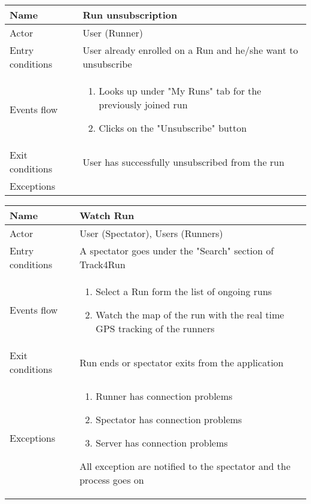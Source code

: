 \begin{table}[h!]
\begin{tabular}{|l|p{12cm}|}
\hline
Name             & Run unsubscription \\ \hline
Actor            & User (Runner) \\ \hline
Entry conditions & User already enrolled on a Run and he/she want to unsubscribe \\ \hline
Events flow      & \begin{enumerate}
\item Looks up under "My Runs" tab for the previously joined run
\item Clicks on the "Unsubscribe" button
\end{enumerate} \\ \hline
Exit conditions  & User has successfully unsubscribed from the run \\ \hline
Exceptions       & \\ \hline
\end{tabular}
\end{table}

\begin{table}[h!]
\begin{tabular}{|l|p{12cm}|}
\hline
Name             & Watch Run \\ \hline
Actor            & User (Spectator), Users (Runners) \\ \hline
Entry conditions & A spectator goes under the "Search" section of Track4Run  \\ \hline
Events flow      & \begin{enumerate}
\item Select a Run form the list of ongoing runs
\item Watch the map of the run with the real time GPS tracking of the runners
\end{enumerate} \\ \hline
Exit conditions  & Run ends or spectator exits from the application \\ \hline
Exceptions       & \begin{enumerate}
\item Runner has connection problems
\item Spectator has connection problems
\item Server has connection problems
\end{enumerate} All exception are notified to the spectator and the process goes on\\ \hline
\end{tabular}
\end{table}

